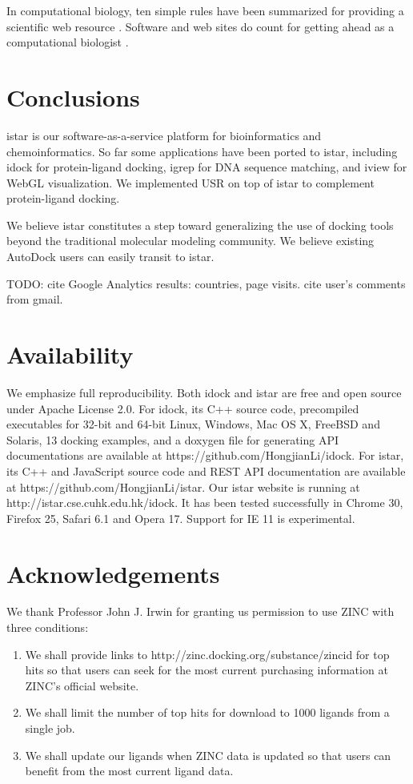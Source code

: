 In computational biology, ten simple rules have been summarized for providing a scientific web resource \citep{677}. Software and web sites do count for getting ahead as a computational biologist \citep{260}.

\section{Conclusions}

istar \citep{1362} is our software-as-a-service platform for bioinformatics and chemoinformatics. So far some applications have been ported to istar, including idock \citep{1153} for protein-ligand docking, igrep \citep{1138} for DNA sequence matching, and iview \citep{1366} for WebGL visualization. We implemented USR on top of istar to complement protein-ligand docking.

We believe istar constitutes a step toward generalizing the use of docking tools beyond the traditional molecular modeling community. We believe existing AutoDock users can easily transit to istar.

TODO: cite Google Analytics results: countries, page visits. cite user's comments from gmail.

\section{Availability}

We emphasize full reproducibility. Both idock and istar are free and open source under Apache License 2.0. For idock, its C++ source code, precompiled executables for 32-bit and 64-bit Linux, Windows, Mac OS X, FreeBSD and Solaris, 13 docking examples, and a doxygen file for generating API documentations are available at https://github.com/HongjianLi/idock. For istar, its C++ and JavaScript source code and REST API documentation are available at https://github.com/HongjianLi/istar. Our istar website is running at http://istar.cse.cuhk.edu.hk/idock. It has been tested successfully in Chrome 30, Firefox 25, Safari 6.1 and Opera 17. Support for IE 11 is experimental.

\section{Acknowledgements}

We thank Professor John J. Irwin for granting us permission to use ZINC \citep{532,1178} with three conditions:
\begin{enumerate}
\item We shall provide links to http://zinc.docking.org/substance/zincid for top hits so that users can seek for the most current purchasing information at ZINC's official website.
\item We shall limit the number of top hits for download to 1000 ligands from a single job.
\item We shall update our ligands when ZINC data is updated so that users can benefit from the most current ligand data.
\end{enumerate}

